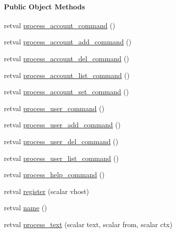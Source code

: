 \begin{Indent}\paragraph*{\-Public \-Object \-Methods}
\begin{DoxyCompactItemize}
\item 
retval \hyperlink{class_d_jabberd_1_1_bot_1_1_admin_ac788636f503ab6f98926e6eb0a4233af}{process\-\_\-account\-\_\-command} ()
\item 
retval \hyperlink{class_d_jabberd_1_1_bot_1_1_admin_a43a565bcb18c497df379b73cb297a591}{process\-\_\-account\-\_\-add\-\_\-command} ()
\item 
retval \hyperlink{class_d_jabberd_1_1_bot_1_1_admin_aab22d4bbacd23e4650bbf09d827940cd}{process\-\_\-account\-\_\-del\-\_\-command} ()
\item 
retval \hyperlink{class_d_jabberd_1_1_bot_1_1_admin_ac6ad01dbe7b768555503598a45bd3c02}{process\-\_\-account\-\_\-list\-\_\-command} ()
\item 
retval \hyperlink{class_d_jabberd_1_1_bot_1_1_admin_a368c31601eb165e6e1fdddc75179a546}{process\-\_\-account\-\_\-set\-\_\-command} ()
\item 
retval \hyperlink{class_d_jabberd_1_1_bot_1_1_admin_a1264efcc5cc107932962c616666b7cfb}{process\-\_\-user\-\_\-command} ()
\item 
retval \hyperlink{class_d_jabberd_1_1_bot_1_1_admin_af6198df67e3d3c91639992257bda20f2}{process\-\_\-user\-\_\-add\-\_\-command} ()
\item 
retval \hyperlink{class_d_jabberd_1_1_bot_1_1_admin_a9e9fd115b7256be670eaf57946af89c9}{process\-\_\-user\-\_\-del\-\_\-command} ()
\item 
retval \hyperlink{class_d_jabberd_1_1_bot_1_1_admin_a0f88d94589f8ab85ae620b16a578e07c}{process\-\_\-user\-\_\-list\-\_\-command} ()
\item 
retval \hyperlink{class_d_jabberd_1_1_bot_1_1_admin_a3c6a720da6a0a3d8b8897f05bf400aa6}{process\-\_\-help\-\_\-command} ()
\item 
retval \hyperlink{class_d_jabberd_1_1_bot_1_1_admin_ad74fd0b541e604cd2a3dd55e48bb8fde}{register} (scalar vhost)
\item 
retval \hyperlink{class_d_jabberd_1_1_bot_1_1_admin_a8216d309921e95f0ffdd98c7048c6d47}{name} ()
\item 
retval \hyperlink{class_d_jabberd_1_1_bot_1_1_admin_a461a346b0fb9d0eab6f4063b015f7e71}{process\-\_\-text} (scalar text, scalar from, scalar ctx)
\end{DoxyCompactItemize}
\end{Indent}


